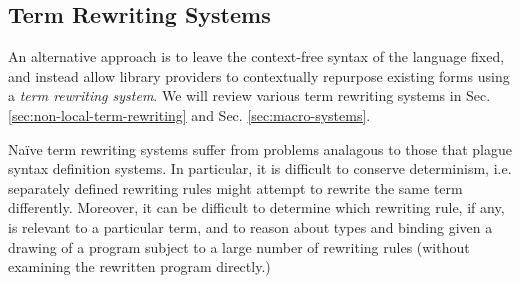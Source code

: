 





\subsection{Term Rewriting Systems}
An alternative approach is to leave the context-free syntax of the language fixed, and instead allow library providers to contextually repurpose existing forms using a \emph{term rewriting system}. We will review various term rewriting systems in Sec. \ref{sec:non-local-term-rewriting} and Sec. \ref{sec:macro-systems}. 

Na\"ive term rewriting systems suffer from problems analagous to those that plague syntax definition systems. In particular, it is difficult to conserve determinism, i.e. separately defined rewriting rules might attempt to rewrite the same term differently. Moreover, it can be difficult to determine which rewriting rule, if any, is relevant to a particular term, and to reason about types and binding given a drawing of a program subject to a large number of rewriting rules (without examining the rewritten program directly.)

